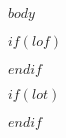 \documentclass[12pt,twoside]{book}
\begin{document}
\mainmatter
\pagestyle{fancy}

$body$
\renewcommand\bibname{References}


$if(lof)$
  \listoffigures
  \clearpage
$endif$

$if(lot)$
  \listoftables
  \clearpage
$endif$
\end{document}
